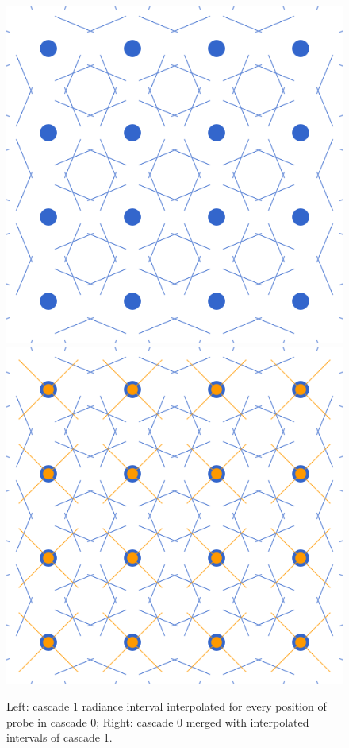 \documentclass{jcgt}
\begin{document}
\begin{figure}[htb]
  \centering
  \includegraphics[width=0.49\columnwidth]{images/cascade 1 on 0 exclusive.png}
  \includegraphics[width=0.49\columnwidth]{images/cascade 1 on 0 merged.png}
  \caption{\label{fig:cascades}
     Left: cascade 1 radiance interval interpolated for every position of probe in cascade 0; Right: cascade 0 merged with interpolated intervals of cascade 1.}
\end{figure}
\end{document}
